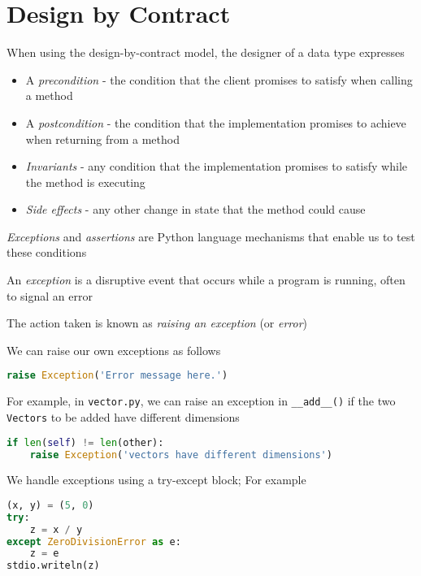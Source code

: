 \documentclass[8pt,a4paper,compress,handout]{beamer}
\begin{document}
\section{Design by Contract}
\begin{frame}[fragile]
When using the design-by-contract model, the designer of a data type expresses
\begin{itemize}
\item A \emph{precondition} - the condition that the client promises to satisfy when calling a method
\item A \emph{postcondition} - the condition that the implementation promises to achieve when returning from a method
\item \emph{Invariants} - any condition that the implementation promises to satisfy while the method is executing 
\item \emph{Side effects} - any other change in state that the method could cause
\end{itemize}

\bigskip

\emph{Exceptions} and \emph{assertions} are Python language mechanisms that enable us to test these conditions
\end{frame}

\begin{frame}[fragile]
An \emph{exception} is a disruptive event that occurs while a program is running, often to signal an error

\bigskip

The action taken is known as \emph{raising an exception} (or \emph{error})

\bigskip

We can raise our own exceptions as follows
\begin{lstlisting}[language=Python]
raise Exception('Error message here.')
\end{lstlisting} 

\bigskip

For example, in \lstinline{vector.py}, we can raise an exception in \lstinline{__add__()} if the two \lstinline{Vectors} to be added have different dimensions
\begin{lstlisting}[language=Python]
if len(self) != len(other):
    raise Exception('vectors have different dimensions')
\end{lstlisting} 

\bigskip

We handle exceptions using a try-except block; For example
\begin{lstlisting}[language=Python]
(x, y) = (5, 0)
try:
    z = x / y
except ZeroDivisionError as e:
    z = e
stdio.writeln(z)
\end{lstlisting} 
\end{frame}
\end{document}
